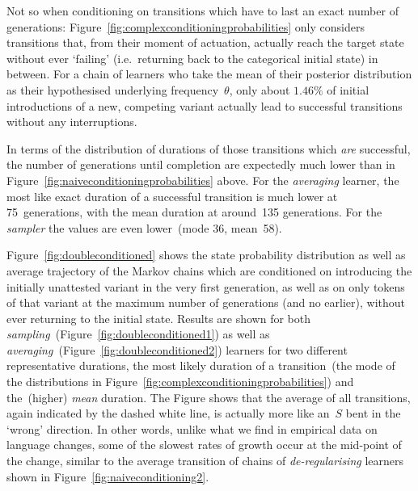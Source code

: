 Not so when conditioning on transitions which have to last an exact number of generations: Figure~\ref{fig:complexconditioningprobabilities} only considers transitions that, from their moment of actuation, actually reach the target state without ever `failing' (i.e.~returning back to the categorical initial state) in between. For a chain of learners who take the mean of their posterior distribution as their hypothesised underlying frequency~$\theta$, only about $1.46\%$ of initial introductions of a new, competing variant actually lead to successful transitions without any interruptions.

In terms of the distribution of durations of those transitions which \emph{are} successful, the number of generations until completion are expectedly much lower than in Figure~\ref{fig:naiveconditioningprobabilities} above. For the \emph{averaging} learner, the most like exact duration of a successful transition is much lower at 75~generations, with the mean duration at around~135 generations.
For the \emph{sampler} the values are even lower~(mode 36, mean~58).

Figure~\ref{fig:doubleconditioned} shows the state probability distribution as well as average trajectory of the Markov chains which are conditioned on introducing the initially unattested variant in the very first generation, as well as on only tokens of that variant at the maximum number of generations (and no earlier), without ever returning to the initial state.
Results are shown for both \emph{sampling}~(Figure~\ref{fig:doubleconditioned1}) as well as \emph{averaging}~(Figure~\ref{fig:doubleconditioned2}) learners for two different representative durations, the most likely duration of a transition~(the mode of the distributions in Figure~\ref{fig:complexconditioningprobabilities}) and the~(higher) \emph{mean} duration. %
The Figure shows that the average of all transitions, again indicated by the dashed white line, is actually more like an~$S$ bent in the `wrong' direction. In other words, unlike what we find in empirical data on language changes, some of the slowest rates of growth occur at the mid-point of the change, similar to the average transition of chains of \emph{de-regularising} learners shown in Figure~\ref{fig:naiveconditioning2}.

